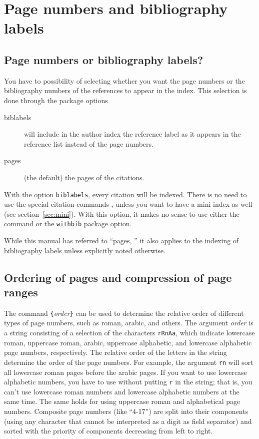 \documentclass[a4paper]{article}
\newcommand{\ltxinp}[1]{\texttt{\string#1}}
\begin{document}
\section{Page numbers and bibliography labels}

\subsection{Page numbers or bibliography labels?}

You have to possibility of selecting whether you want the page numbers or the
bibliography numbers of the references to appear in the index. This selection
is done through the package options
\begin{description}
\item[biblabels] will include in the author index the reference label as it
  appears in the reference list instead of the page numbers.
\item[pages] (the default) the pages of the citations.
\end{description}
With the option \ltxinp{biblabels}, every citation will be indexed. There is no
need to use the special citation commands \ltxinp{\aicite}, unless you want to
have a mini index as well (see section~\ref{sec:mini}).  With this option, it
makes no sense to use either the \ltxinp{\aimention} command or the
\ltxinp{withbib} package option.

While this manual has referred to ``pages, '' it also applies to the indexing
of bibliography labels unless explicitly noted otherwise.


\subsection{Ordering of pages and compression of page ranges}

The command \ltxinp{\aipagetypeorder}\verb|{|\textit{order\/}\verb|}| can be
used to determine the relative order of different types of page numbers, such
as roman, arabic, and others. The argument \textit{order\/} is a string
consisting of a selection of the characters \ltxinp{rRnAa}, which indicate
lowercase roman, uppercase roman, arabic, uppercase alphabetic, and lowercase
alphabetic page numbers, respectively. The relative order of the letters in the
string determine the order of the page numbers. For example, the argument
\ltxinp{rn} will sort all lowercase roman pages before the arabic pages. If you
want to use lowercase alphabetic numbers, you have to use
\ltxinp{\aipagetypeorder} without putting \ltxinp{r} in the string; that is,
you can't use lowercase roman numbers and lowercase alphabetic numbers at the
same time. The same holds for using uppercase roman and alphabetical page
numbers. Composite page numbers (like ``4-17'') are split into their components
(using any character that cannot be interpreted as a digit as field separator)
and sorted with the priority of components decreasing from left to right.
\end{document}
